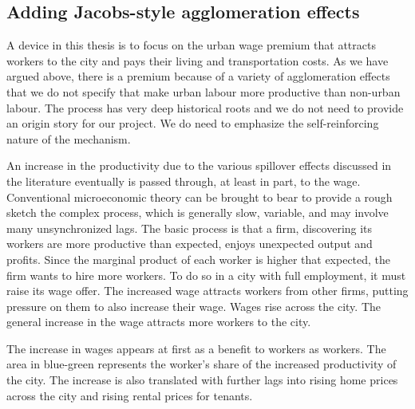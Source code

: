 \subsection{Adding Jacobs-style agglomeration effects}
A device in this thesis is to focus on the urban wage premium that attracts workers to the city and pays their living and transportation costs. As we have argued above, there is a premium because of a variety of agglomeration effects that we do not specify that make urban labour more productive than non-urban labour. The process has very deep historical roots and we do not need to provide an origin story for our project. We do need to emphasize the self-reinforcing nature of the mechanism.

An increase in the productivity due to the various spillover effects discussed in the literature eventually is passed through, at least in part, to the wage. Conventional microeconomic theory can be brought to bear to provide a rough sketch the  complex process, which is generally slow, variable, and may involve many unsynchronized lags.  The basic process is that a firm, discovering its workers are  more productive than expected, enjoys unexpected output and profits. Since the marginal product of each worker is higher that expected, the firm  wants to hire more workers. To do so in a city with full employment, it must raise its wage offer. The increased wage attracts workers from other firms, putting pressure on them to also increase their wage. Wages rise across the city. The general increase in the wage attracts more workers to the city. 

The increase in wages appears at first as a benefit to workers as workers. The area in blue-green represents the worker's share of the increased productivity of the city. The increase is also translated with further lags into rising home prices across the city and rising rental prices for tenants. 


\begin{center}
\end{center}

